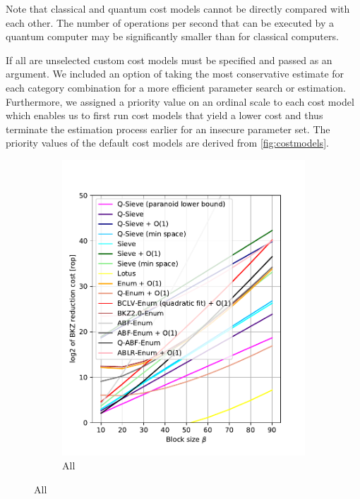 Note that classical and quantum cost models cannot be directly compared with each other. The number of operations per second that can be executed by a quantum computer may be significantly smaller than for classical computers. %

If all are unselected custom cost models must be specified and passed as an argument. We included an option of taking the most conservative estimate for each category combination for a more efficient parameter search or estimation. Furthermore, we assigned a priority value on an ordinal scale to each cost model which enables us to first run cost models that yield a lower cost and thus terminate the estimation process earlier for an insecure parameter set. The priority values of the default cost models are derived from \cref{fig:costmodels}.
\begin{figure}[h!]
    \centering
    \begin{subfigure}{0.5\textwidth}
        \centering
        \includegraphics[width=1\textwidth]{graphics/cost_models.pdf}
        \caption{All}
    \end{subfigure}

\end{figure}
